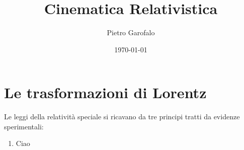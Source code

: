 \documentclass[a4paper, 12pt, twoside]{report}
\title{Cinematica Relativistica}
\author{Pietro Garofalo}
\date{\today}
\begin{document}
\maketitle
\newpage
\tableofcontents

\chapter{Le trasformazioni di Lorentz }
Le leggi della relatività speciale si ricavano da tre principi tratti da evidenze sperimentali: 
\begin{enumerate}[label=(\roman)]
        \item Ciao  

\end{enumerate}
\end{document}
